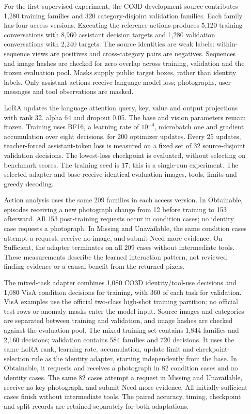 For the first supervised experiment, the CO3D development source contributes 1,280 training families and 320 category-disjoint validation families.
Each family has four access versions.
Executing the reference actions produces 5,120 training conversations with 8,960 assistant decision targets and 1,280 validation conversations with 2,240 targets.
The source identities are weak labels: within-sequence views are positives and cross-category pairs are negatives.
Sequences and image hashes are checked for zero overlap across training, validation and the frozen evaluation pool.
Masks supply public target boxes, rather than identity labels.
Only assistant actions receive language-model loss; photographs, user messages and tool observations are masked.

LoRA updates the language attention query, key, value and output projections with rank 32, alpha 64 and dropout 0.05.
The base and vision parameters remain frozen.
Training uses BF16, a learning rate of \(10^{-4}\), microbatch one and gradient accumulation over eight decisions, for 200 optimizer updates.
Every 25 updates, teacher-forced assistant-token loss is measured on a fixed set of 32 source-disjoint validation decisions.
The lowest-loss checkpoint is evaluated, without selecting on benchmark scores.
The training seed is 17; this is a single-run experiment.
The selected adapter and base receive identical evaluation images, tools, limits and greedy decoding.

Action analysis uses the same 209 families in each access version.
In Obtainable, episodes receiving a new photograph change from 12 before training to 153 afterward.
All 153 post-training requests occur in condition cases; no identity case requests a photograph.
In Missing and Unavailable, the same condition cases attempt a request, receive no image, and submit Need more evidence.
On Sufficient, the adapter terminates on all 209 cases without intermediate tools.
These measurements describe the learned interaction pattern, not reviewed finding evidence or a causal benefit from the returned pixels.

The mixed-task adapter combines 1,080 CO3D identity/tool-use decisions and 1,080 VisA condition decisions for training, with 360 of each task for validation.
VisA examples use the official two-class high-shot training partition; no official test rows or anomaly masks enter the model input.
Source images and categories are separated between training and validation, and image hashes are checked against the evaluation pool.
The mixed training set contains 1,844 families and 2,160 decisions; validation contains 584 families and 720 decisions.
It uses the same LoRA rank, learning rate, accumulation, update limit and checkpoint-selection rule as the identity adapter, starting independently from the base.
In Obtainable, it requests and receives a photograph in 82 condition cases and no identity cases.
The same 82 cases attempt a request in Missing and Unavailable, receive no key photograph, and submit Need more evidence.
All initially sufficient cases finish without intermediate tools.
The paired accuracy, timing, checkpoint and split records are retained separately for both adaptations.

